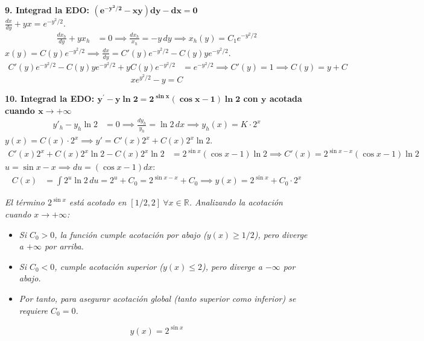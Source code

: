 \documentclass[11pt, a4paper]{article}
\begin{document}
\noindent\textbf{9. Integrad la EDO: $\bm{(e^{-y^{2}/2}-xy)dy-dx=0}$} \\
$\frac{dx}{dy} + yx = e^{-y^2/2}$. \\
\begin{align*}
\frac{dx_h}{dy} + yx_h &= 0 \implies \frac{dx_h}{x_h} = -y\,dy \implies x_h(y) = C_1 e^{-y^2/2}
\end{align*}
$x(y) = C(y)e^{-y^2/2} \implies \frac{dx}{dy} = C'(y)e^{-y^2/2} - C(y)y e^{-y^2/2}$. \\
\begin{align*}
C'(y)e^{-y^2/2} - C(y)y e^{-y^2/2} + y C(y)e^{-y^2/2} &= e^{-y^2/2} \implies C'(y) = 1 \implies C(y) = y + C
\end{align*}
\[
\boxed{x e^{y^2/2} - y = C}
\]


\noindent\textbf{10. Integrad la EDO: $\bm{y^{\prime}-y\ln 2=2^{\sin x}(\cos x-1)\ln 2}$ con $\bm{y}$ acotada cuando $\bm{x\rightarrow+\infty}$} \\
\begin{align*}
y'_h - y_h\ln 2 &= 0 \implies \frac{dy_h}{y_h} = \ln 2\,dx \implies y_h(x) = K \cdot 2^x
\end{align*}
$y(x) = C(x) \cdot 2^x \implies y' = C'(x)2^x + C(x)2^x \ln 2$. \\
\begin{align*}
C'(x)2^x + C(x)2^x \ln 2 - C(x)2^x \ln 2 &= 2^{\sin x}(\cos x - 1)\ln 2 \implies C'(x) = 2^{\sin x - x}(\cos x - 1)\ln 2
\end{align*}
$u = \sin x - x \implies du = (\cos x - 1)dx$:
\begin{align*}
C(x) &= \int 2^u \ln 2\,du = 2^u + C_0 = 2^{\sin x - x} + C_0 \implies y(x) = 2^{\sin x} + C_0 \cdot 2^x
\end{align*}

\textit{El término $2^{\sin x}$ está acotado en $[1/2, 2]\ \forall x \in \mathbb{R}$. Analizando la acotación cuando $x \to +\infty$:}
\begin{itemize}
\item \textit{Si $C_0 > 0$, la función cumple acotación por abajo ($y(x) \geq 1/2$), pero diverge a $+\infty$ por arriba.}
\item \textit{Si $C_0 < 0$, cumple acotación superior ($y(x) \leq 2$), pero diverge a $-\infty$ por abajo.}
\item \textit{Por tanto, para asegurar acotación global (tanto superior como inferior) se requiere $C_0 = 0$.}
\end{itemize}
\[
\boxed{y(x) = 2^{\sin x}}
\]
\end{document}
